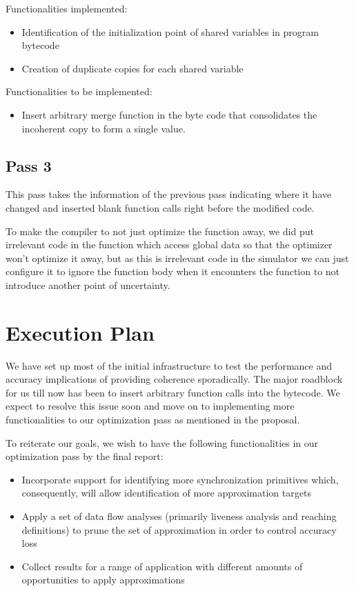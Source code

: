 \documentclass[12pt,conference]{IEEEtran}
\begin{document}
Functionalities implemented:
\begin{itemize}
\item Identification of the initialization point of shared variables in program bytecode
\item Creation of duplicate copies for each shared variable
\end{itemize}

Functionalities to be implemented:
\begin{itemize}
\item Insert arbitrary merge function in the byte code that consolidates the 
incoherent copy to form a single value.
\end{itemize}

\subsection{Pass 3}

This pass takes the information of the previous pass indicating where it have changed and inserted blank function calls right before the modified code.

To make the compiler to not just optimize the function away, we did put irrelevant code in the function which access global data so that the optimizer won't optimize it away, but as this is irrelevant code in the simulator we can just configure it to ignore the function body when it encounters the function to not introduce another point of uncertainty.

\section{Execution Plan}

We have set up most of the initial infrastructure to test the performance and 
accuracy implications of providing coherence sporadically. The major roadblock
for us till now has been to insert arbitrary function calls into the bytecode.
We expect to resolve this issue soon and move on to implementing more 
functionalities to our optimization pass as mentioned in the proposal.

To reiterate our goals, we wish to have the following functionalities in
our optimization pass by the final report:
\begin{itemize}
\item Incorporate support for identifying more synchronization primitives
which, consequently, will allow identification of more approximation targets
\item Apply a set of data flow analyses (primarily liveness analysis and 
reaching definitions) to prune the set of approximation in order to control
accuracy loss
\item Collect results for a range of application with different amounts of 
opportunities to apply approximations
\end{itemize}
\end{document}

